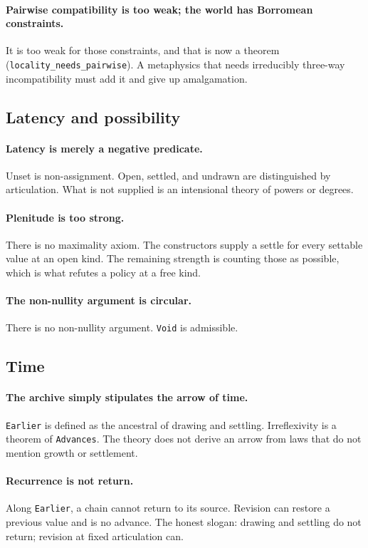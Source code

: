 \documentclass[11pt]{article}
\theoremstyle{definition}
\newcommand{\lean}[1]{\nolinkurl{#1}}
\begin{document}
\paragraph{Pairwise compatibility is too weak; the world has
Borromean constraints.}
It is too weak for those constraints, and that is now a theorem
(\lean{locality\_needs\_pairwise}). A metaphysics that needs
irreducibly three-way incompatibility must add it and give up
amalgamation.

\subsection{Latency and possibility}

\paragraph{Latency is merely a negative predicate.}
Unset is non-assignment. Open, settled, and undrawn are distinguished
by articulation. What is not supplied is an intensional theory of
powers or degrees.

\paragraph{Plenitude is too strong.}
There is no maximality axiom. The constructors supply a settle for
every settable value at an open kind. The remaining strength is
counting those as possible, which is what refutes a policy at a free
kind.

\paragraph{The non-nullity argument is circular.}
There is no non-nullity argument. \lean{Void} is admissible.

\subsection{Time}

\paragraph{The archive simply stipulates the arrow of time.}
\lean{Earlier} is defined as the ancestral of drawing and settling.
Irreflexivity is a theorem of \lean{Advances}. The theory does not
derive an arrow from laws that do not mention growth or settlement.

\paragraph{Recurrence is not return.}
Along \lean{Earlier}, a chain cannot return to its source. Revision
can restore a previous value and is no advance. The honest slogan:
drawing and settling do not return; revision at fixed articulation
can.
\end{document}
